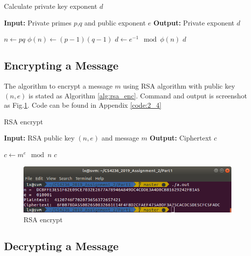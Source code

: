\begin{algorithm}
\caption{Calculate private key exponent $d$}
\label{alg:rsa_pqe_d}
\begin{algorithmic}
\STATE \textbf{Input:} Private primes $p$,$q$ and public exponent $e$
\STATE \textbf{Output:} Private exponent $d$

\STATE $ n \gets pq $
\STATE $ \phi(n) \gets (p-1)(q-1) $
\STATE $ d \gets e^{-1} \mod{\phi(n)} $
\RETURN $ d $
\end{algorithmic}
\end{algorithm}

\subsection{Encrypting a Message}

The algorithm to encrypt a message $m$ using RSA algorithm with public key $(n, e) $ is stated as Algorithm \ref{alg:rsa_enc}.
Command and output is screenshot as Fig.\ref{fig:p2_4}.
Code can be found in Appendix \ref{code:2_4}

\begin{algorithm}
\caption{RSA encrypt}
\label{alg:rsa_enc}
\begin{algorithmic}
\STATE \textbf{Input:} RSA public key $(n, e)$ and message $m$
\STATE \textbf{Output:} Ciphertext $c$

\STATE $ c \gets m^e \mod{n} $
\RETURN $ c $
\end{algorithmic}
\end{algorithm}

\begin{figure}[ht]
\centering
\includegraphics[width=\columnwidth]{pictures/p2_4.png}
\caption{
    RSA encrypt
}
\label{fig:p2_4}
\end{figure}

\subsection{Decrypting a Message}

